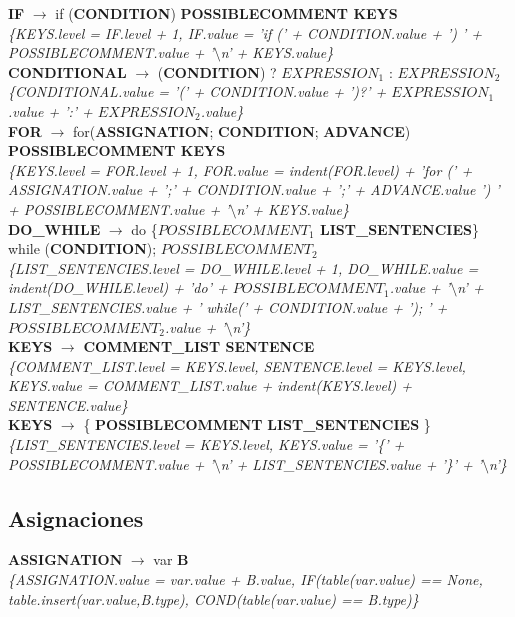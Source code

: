 \documentclass[10pt,a4paper]{article}
\begin{document}
\textbf{IF} $\rightarrow$ if (\textbf{CONDITION}) \textbf{POSSIBLECOMMENT KEYS} \\
\textit{\{KEYS.level = IF.level + 1, IF.value = 'if (' + CONDITION.value + ') ' + POSSIBLECOMMENT.value + '$\setminus$n' + KEYS.value\}} \\

\textbf{CONDITIONAL} $\rightarrow$ (\textbf{CONDITION}) ? \textbf{$EXPRESSION_{1}$} : \textbf{$EXPRESSION_{2}$}  \\
\textit{\{CONDITIONAL.value = '(' + CONDITION.value + ')?' + $EXPRESSION_{1}$.value + ':' + $EXPRESSION_{2}$.value\}}\\
	
\textbf{FOR} $\rightarrow$ for(\textbf{ASSIGNATION}; \textbf{CONDITION}; \textbf{ADVANCE}) \textbf{POSSIBLECOMMENT KEYS}  \\
\textit{\{KEYS.level = FOR.level + 1, FOR.value = indent(FOR.level) + 'for (' + ASSIGNATION.value + ';' + CONDITION.value + ';' + ADVANCE.value ') ' + POSSIBLECOMMENT.value + '$\setminus$n' + KEYS.value\}}\\

\textbf{DO\_WHILE} $\rightarrow$ do \{\textbf{$POSSIBLECOMMENT_{1}$ LIST\_SENTENCIES}\} while (\textbf{CONDITION}); \textbf{$POSSIBLECOMMENT_{2}$} \\
\textit{\{LIST\_SENTENCIES.level = DO\_WHILE.level + 1, DO\_WHILE.value = indent(DO\_WHILE.level) + 'do{' + $POSSIBLECOMMENT_{1}$.value + '$\setminus$n' + LIST\_SENTENCIES.value + '} while(' + CONDITION.value + '); ' + $POSSIBLECOMMENT_{2}$.value + '$\setminus$n'\}}\\

\textbf{KEYS} $\rightarrow$ \textbf{COMMENT\_LIST SENTENCE} \\ 
\textit{\{COMMENT\_LIST.level = KEYS.level, SENTENCE.level = KEYS.level, KEYS.value = COMMENT\_LIST.value + indent(KEYS.level) + SENTENCE.value\}} \\

\textbf{KEYS} $\rightarrow$ \{ \textbf{POSSIBLECOMMENT} \textbf{LIST\_SENTENCIES} \} \\
\textit{\{LIST\_SENTENCIES.level = KEYS.level, KEYS.value = '\{' + POSSIBLECOMMENT.value + '$\setminus$n' + LIST\_SENTENCIES.value + '\}' + '$\setminus$n'\}} \\

\subsection{Asignaciones}
\textbf{ASSIGNATION} $\rightarrow$ var \textbf{B} \\
\textit{\{ASSIGNATION.value = var.value + B.value, IF(table(var.value) == None, table.insert(var.value,B.type), COND(table(var.value) == B.type)\}} \\
\end{document}
